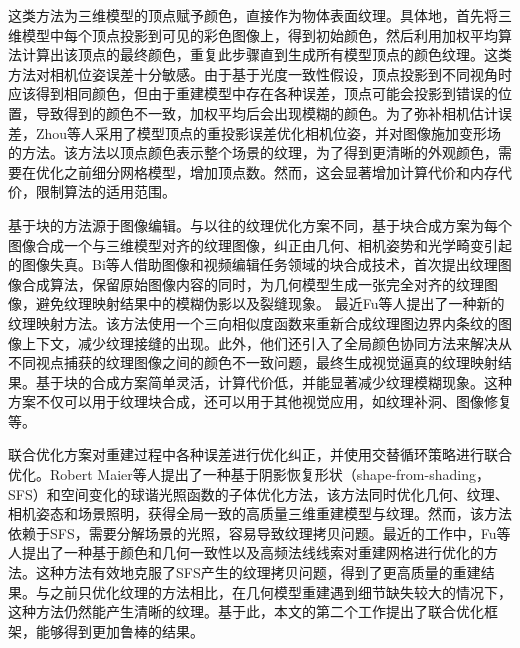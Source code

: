 \vspace*{2mm}这类方法为三维模型的顶点赋予颜色，直接作为物体表面纹理。具体地，首先将三维模型中每个顶点投影到可见的彩色图像上，得到初始颜色，然后利用加权平均算法计算出该顶点的最终颜色，重复此步骤直到生成所有模型顶点的颜色纹理。这类方法对相机位姿误差十分敏感。由于基于光度一致性假设，顶点投影到不同视角时应该得到相同颜色，但由于重建模型中存在各种误差，顶点可能会投影到错误的位置，导致得到的颜色不一致，加权平均后会出现模糊的颜色。为了弥补相机估计误差，Zhou等人采用了模型顶点的重投影误差优化相机位姿，并对图像施加变形场的方法。该方法以顶点颜色表示整个场景的纹理，为了得到更清晰的外观颜色，需要在优化之前细分网格模型，增加顶点数。然而，这会显著增加计算代价和内存代价，限制算法的适用范围。\par



\vspace*{2mm}基于块的方法源于图像编辑。与以往的纹理优化方案不同，基于块合成方案为每个图像合成一个与三维模型对齐的纹理图像，纠正由几何、相机姿势和光学畸变引起的图像失真。Bi等人借助图像和视频编辑任务领域的块合成技术，首次提出纹理图像合成算法，保留原始图像内容的同时，为几何模型生成一张完全对齐的纹理图像，避免纹理映射结果中的模糊伪影以及裂缝现象。
最近Fu等人提出了一种新的纹理映射方法。该方法使用一个三向相似度函数来重新合成纹理图边界内条纹的图像上下文，减少纹理接缝的出现。此外，他们还引入了全局颜色协同方法来解决从不同视点捕获的纹理图像之间的颜色不一致问题，最终生成视觉逼真的纹理映射结果。基于块的合成方案简单灵活，计算代价低，并能显著减少纹理模糊现象。这种方案不仅可以用于纹理块合成，还可以用于其他视觉应用，如纹理补洞、图像修复等。\par

\vspace*{2mm}联合优化方案对重建过程中各种误差进行优化纠正，并使用交替循环策略进行联合优化。Robert Maier等人提出了一种基于阴影恢复形状（shape-from-shading，SFS）和空间变化的球谐光照函数的子体优化方法，该方法同时优化几何、纹理、相机姿态和场景照明，获得全局一致的高质量三维重建模型与纹理。然而，该方法依赖于SFS，需要分解场景的光照，容易导致纹理拷贝问题。最近的工作中，Fu等人提出了一种基于颜色和几何一致性以及高频法线线索对重建网格进行优化的方法。这种方法有效地克服了SFS产生的纹理拷贝问题，得到了更高质量的重建结果。与之前只优化纹理的方法相比，在几何模型重建遇到细节缺失较大的情况下，这种方法仍然能产生清晰的纹理。基于此，本文的第二个工作提出了联合优化框架，能够得到更加鲁棒的结果。\par

